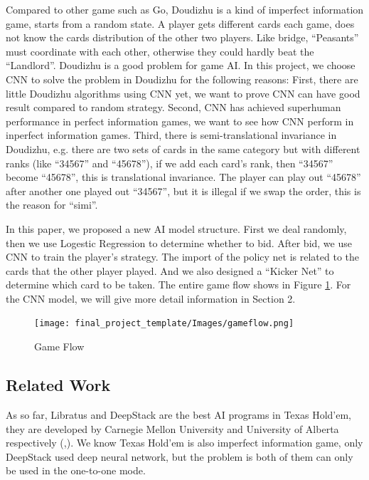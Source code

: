 \documentclass{article}
\begin{document}
Compared to other game such as Go, Doudizhu is a kind of imperfect information game, starts from a random state. A player gets different cards each game, does not know the cards distribution of the other two players. Like bridge, ``Peasants'' must coordinate with each other, otherwise they could hardly beat the ``Landlord''. Doudizhu is a good problem for game AI. In this project, we choose CNN to solve the problem in Doudizhu for the following reasons: First, there are little Doudizhu algorithms using CNN yet, we want to prove CNN can have good result compared to random strategy. Second, CNN has achieved superhuman performance in perfect information games, we want to see how CNN perform in inperfect information games. Third, there is semi-translational invariance in Doudizhu, e.g. there are two sets of cards in the same category but with different ranks (like ``34567'' and ``45678''), if we add each card's rank, then ``34567'' become ``45678'', this is translational invariance. The player can play out ``45678'' after another one played out ``34567'', but it is illegal if we swap the order, this is the reason for ``simi''.

In this paper, we proposed a new AI model structure. First we deal randomly, then we use Logestic Regression to determine whether to bid. After bid, we use CNN to train the player's strategy. The import of the policy net is related to the cards that the other player played. And we also designed a ``Kicker Net'' to determine which card to be taken. The entire game flow shows in Figure \ref{gameflow}. For the CNN model, we will give more detail information in Section 2.
\graphicspath{{Images/}}
\maketitle
\begin{figure}[htp]
    \caption{Game Flow} \label{gameflow}
    \centering 
    \texttt{[image: final\_project\_template/Images/gameflow.png]}
    \label{gameflow} 
\end{figure}

\subsection{Related Work}
As so far, Libratus and DeepStack are the best AI programs in Texas Hold'em, they are developed by Carnegie Mellon University and University of Alberta respectively (\cite{brown2018superhuman},\cite{moravvcik2017deepstack}). We know Texas Hold'em is also imperfect information game, only DeepStack used deep neural network, but the problem is both of them can only be used in the one-to-one mode.
\end{document}

